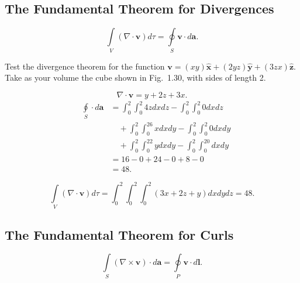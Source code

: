 \subsection{The Fundamental Theorem for Divergences}

\begin{equation}
    \underset{V}{\int}(\nabla\cdot\mathbf{v})d\tau = \underset{S}\oint\mathbf{v}\cdot d\mathbf{a}.
\end{equation}

\begin{prob}[1.33] Test the divergence theorem for the function
    $\mathbf{v} = (xy)\mathbf{\hat{x}} + (2yz)\mathbf{\hat{y}} + (3zx)\mathbf{\hat{z}}$. 
    Take as your volume the cube shown in Fig.~1.30, with sides of length 2.
\end{prob}

\begin{sol}[1.33]
    \begin{equation}
        \nabla\cdot \mathbf{v} = y + 2z + 3x.
    \end{equation}
    \begin{equation}
        \begin{aligned}
            \quad\underset{S}{\oint}\cdot d\mathbf{a}
            &= \int_0^2 \int_0^2 4z dx dz - \int_0^2 \int_0^2 0dxdz \\
            &\quad  + \int_0^2 \int_0^26xdxdy - \int_0^2 \int_0^2 0 dxdy \\
            &\quad + \int_0^2 \int_0^22y dxdy - \int_0^2\int_0^20dxdy \\
        &=16 - 0 + 24 - 0 + 8 - 0 \\
        &= 48.
        \end{aligned}
    \end{equation}

    \begin{equation}
        \underset{V}{\int}(\nabla\cdot\mathbf{v})d\tau = \int_0^2\int_0^2\int_0^2(3x + 2z + y) dxdydz = 48.
    \end{equation}
\end{sol}

\subsection{The Fundamental Theorem for Curls}
\begin{equation}
    \underset{S}{\int} (\nabla\times\mathbf{v})\cdot d\mathbf{a} = \underset{P}{\oint}\mathbf{v}\cdot d\mathbf{l}.
\end{equation}

